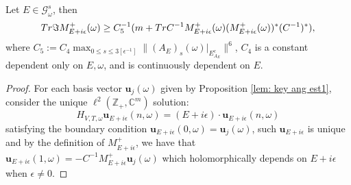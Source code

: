\documentclass[10pt,a4paper]{amsart}
\newcommand{\tr}{{\rm Tr}}
\begin{document}
\begin{lemma}\label{imm}
    Let $E\in \mathcal{G}_\omega^s$, then 
    \begin{equation}\label{eqn: criterion key ineq}
     \tr\Im M_{E+i\epsilon}^+(\omega)\geq 
	 C_5^{-1}(m+\tr C^{-1} M_{E+i\epsilon}^+(\omega)(M_{E+i\epsilon}^+(\omega))^\ast(C^{-1})^*),   
    \end{equation}
	 where $C_5:=C_4\max_{0\leq s\leq 3[\epsilon^{-1}]}\|(A_E)_{s}(\omega)|_{E^c_{A_E}}\|^6$, $C_4$ is a constant dependent only on $E,\omega$, and is continuously dependent on $E.$
\end{lemma}

\begin{proof}


For each basis vector $\mathbf{u}_j(\omega)$ given by Proposition \ref{lem: key ang est1}, consider the unique $\ell^2(\mathbb{Z}_+,\mathbb{C}^m)$ solution:
\begin{equation*}
	H_{V,T,\omega}\mathbf{u}_{E+i\epsilon}(n,\omega) = (E+i\epsilon)\cdot \mathbf{u}_{E+i\epsilon}(n,\omega)
\end{equation*}
satisfying the boundary condition  $\mathbf{u}_{E+i\epsilon}(0,\omega)=\mathbf{u}_j(\omega)$, such $\mathbf{u}_{E+i\epsilon}$ is unique and by the definition of $M^+_{E+i\epsilon}$, we have that $\mathbf{u}_{E+i\epsilon}(1,\omega)=-C^{-1}M_{E+i\epsilon}^+\mathbf{u}_j(\omega)$ which holomorphically depends on $E+i\epsilon$ when $\epsilon\neq 0$.


\end{proof}
\end{document}
